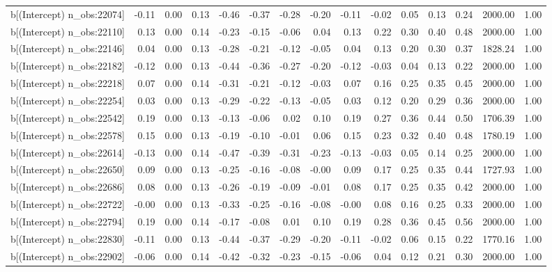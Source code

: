 \begin{table}[ht]
\begin{tabular}{rrrrrrrrrrrrrrr}
  b[(Intercept) n\_obs:22074] & -0.11 & 0.00 & 0.13 & -0.46 & -0.37 & -0.28 & -0.20 & -0.11 & -0.02 & 0.05 & 0.13 & 0.24 & 2000.00 & 1.00 \\ 
  b[(Intercept) n\_obs:22110] & 0.13 & 0.00 & 0.14 & -0.23 & -0.15 & -0.06 & 0.04 & 0.13 & 0.22 & 0.30 & 0.40 & 0.48 & 2000.00 & 1.00 \\ 
  b[(Intercept) n\_obs:22146] & 0.04 & 0.00 & 0.13 & -0.28 & -0.21 & -0.12 & -0.05 & 0.04 & 0.13 & 0.20 & 0.30 & 0.37 & 1828.24 & 1.00 \\ 
  b[(Intercept) n\_obs:22182] & -0.12 & 0.00 & 0.13 & -0.44 & -0.36 & -0.27 & -0.20 & -0.12 & -0.03 & 0.04 & 0.13 & 0.22 & 2000.00 & 1.00 \\ 
  b[(Intercept) n\_obs:22218] & 0.07 & 0.00 & 0.14 & -0.31 & -0.21 & -0.12 & -0.03 & 0.07 & 0.16 & 0.25 & 0.35 & 0.45 & 2000.00 & 1.00 \\ 
  b[(Intercept) n\_obs:22254] & 0.03 & 0.00 & 0.13 & -0.29 & -0.22 & -0.13 & -0.05 & 0.03 & 0.12 & 0.20 & 0.29 & 0.36 & 2000.00 & 1.00 \\ 
  b[(Intercept) n\_obs:22542] & 0.19 & 0.00 & 0.13 & -0.13 & -0.06 & 0.02 & 0.10 & 0.19 & 0.27 & 0.36 & 0.44 & 0.50 & 1706.39 & 1.00 \\ 
  b[(Intercept) n\_obs:22578] & 0.15 & 0.00 & 0.13 & -0.19 & -0.10 & -0.01 & 0.06 & 0.15 & 0.23 & 0.32 & 0.40 & 0.48 & 1780.19 & 1.00 \\ 
  b[(Intercept) n\_obs:22614] & -0.13 & 0.00 & 0.14 & -0.47 & -0.39 & -0.31 & -0.23 & -0.13 & -0.03 & 0.05 & 0.14 & 0.25 & 2000.00 & 1.00 \\ 
  b[(Intercept) n\_obs:22650] & 0.09 & 0.00 & 0.13 & -0.25 & -0.16 & -0.08 & -0.00 & 0.09 & 0.17 & 0.25 & 0.35 & 0.44 & 1727.93 & 1.00 \\ 
  b[(Intercept) n\_obs:22686] & 0.08 & 0.00 & 0.13 & -0.26 & -0.19 & -0.09 & -0.01 & 0.08 & 0.17 & 0.25 & 0.35 & 0.42 & 2000.00 & 1.00 \\ 
  b[(Intercept) n\_obs:22722] & -0.00 & 0.00 & 0.13 & -0.33 & -0.25 & -0.16 & -0.08 & -0.00 & 0.08 & 0.16 & 0.25 & 0.33 & 2000.00 & 1.00 \\ 
  b[(Intercept) n\_obs:22794] & 0.19 & 0.00 & 0.14 & -0.17 & -0.08 & 0.01 & 0.10 & 0.19 & 0.28 & 0.36 & 0.45 & 0.56 & 2000.00 & 1.00 \\ 
  b[(Intercept) n\_obs:22830] & -0.11 & 0.00 & 0.13 & -0.44 & -0.37 & -0.29 & -0.20 & -0.11 & -0.02 & 0.06 & 0.15 & 0.22 & 1770.16 & 1.00 \\ 
  b[(Intercept) n\_obs:22902] & -0.06 & 0.00 & 0.14 & -0.42 & -0.32 & -0.23 & -0.15 & -0.06 & 0.04 & 0.12 & 0.21 & 0.30 & 2000.00 & 1.00 \\ 

\end{tabular}
\end{table}
